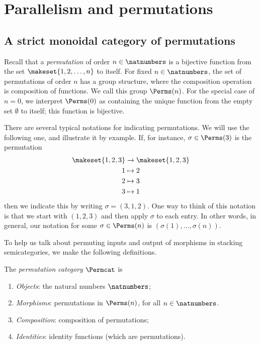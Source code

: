 
\section{Parallelism and permutations}
\label{sec:parallelism-and-permutations}


\subsection{A strict monoidal category of permutations}

Recall that a \emph{permutation} of order $n \in \natnumbers$ is a bijective function from the set $\makeset{1,2, \dots , n}$ to itself. For fixed $n \in \natnumbers$, the set of permutations of order $n$ has a group structure, where the composition operation is composition of functions. We call this group $\Perms(n)$. For the special case of $n = 0$, we interpret $\Perms(0)$ as containing the unique function from the empty set $\emptyset$ to itself; this function is bijective. 

There are several typical notations for indicating permutations. We will use the following one, and illustrate it by example. If, for instance, $\sigma \in \Perms(3)$ is the permutation 
\begin{align*}
\makeset{1,2,3} & \to \makeset{1,2,3} \\
1 & \mapsto 2 \\
2 & \mapsto 3 \\
3 & \mapsto 1
\end{align*}
then we indicate this by writing $\sigma = (3, 1, 2)$. One way to think of this notation is that we start with $(1, 2, 3)$ and then apply $\sigma$ to each entry. In other words, in general, our notation for some $\sigma \in \Perms(n)$ is $(\sigma(1), \dots, \sigma(n))$. 

To help us talk about permuting inputs and output of morphisms in stacking semicategories, we make the following definitions. 

\begin{definition}
The \emph{permutation category} $\Permcat$ is
\begin{enumerate}
\item \emph{Objects}: the natural numbers $\natnumbers$;
\item \emph{Morphisms}: permutations in $\Perms(n)$, for all $n \in \natnumbers$. 
\item \emph{Composition}: composition of permutations;
\item \emph{Identities}: identity functions (which are permutations).
\end{enumerate}
\end{definition}

